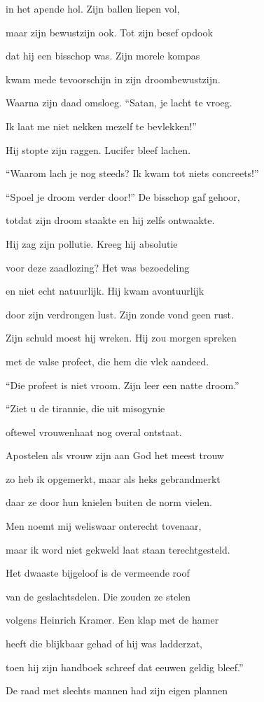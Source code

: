 in het apende hol.
Zijn ballen liepen vol,

maar zijn bewustzijn ook.
Tot zijn besef opdook

dat hij een bisschop was.
Zijn morele kompas

kwam mede tevoorschijn
in zijn droombewustzijn.

Waarna zijn daad omsloeg.
“Satan, je lacht te vroeg.

Ik laat me niet nekken
mezelf te bevlekken!”

Hij stopte zijn raggen.
Lucifer bleef lachen.

“Waarom lach je nog steeds?
Ik kwam tot niets concreets!”

“Spoel je droom verder door!”
De bisschop gaf gehoor,

totdat zijn droom staakte
en hij zelfs ontwaakte.

Hij zag zijn pollutie.
Kreeg hij absolutie

voor deze zaadlozing?
Het was bezoedeling

en niet echt natuurlijk.
Hij kwam avontuurlijk

door zijn verdrongen lust.
Zijn zonde vond geen rust.

Zijn schuld moest hij wreken.
Hij zou morgen spreken

met de valse profeet,
die hem die vlek aandeed.

“Die profeet is niet vroom.
Zijn leer een natte droom.”

“Ziet u de tirannie,
die uit misogynie

oftewel vrouwenhaat
nog overal ontstaat.

Apostelen als vrouw
zijn aan God het meest trouw

zo heb ik opgemerkt,
maar als heks gebrandmerkt

daar ze door hun knielen
buiten de norm vielen.

Men noemt mij weliswaar
onterecht tovenaar,

maar ik word niet gekweld
laat staan terechtgesteld.

Het dwaaste bijgeloof
is de vermeende roof

van de geslachtsdelen.
Die zouden ze stelen

volgens Heinrich Kramer.
Een klap met de hamer

heeft die blijkbaar gehad
of hij was ladderzat,

toen hij zijn handboek schreef
dat eeuwen geldig bleef.”

De raad met slechts mannen
had zijn eigen plannen

